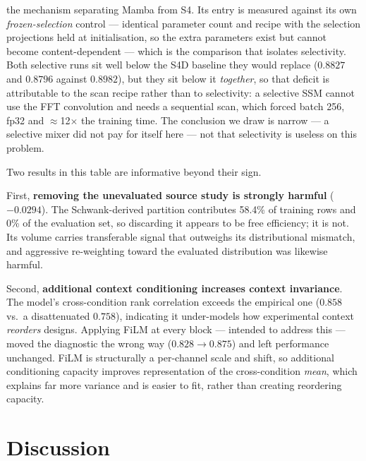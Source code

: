 \documentclass[11pt]{article}
\begin{document}
\begin{table}[H]
\begin{threeparttable}
\begin{tablenotes}[flushleft]
the mechanism separating Mamba \citep{gu2023mamba} from S4. Its entry is measured
against its own \emph{frozen-selection} control --- identical parameter count and
recipe with the selection projections held at initialisation, so the extra parameters
exist but cannot become content-dependent --- which is the comparison that isolates
selectivity. Both selective runs sit well below the S4D baseline they would replace
($0.8827$ and $0.8796$ against $0.8982$), but they sit below it \emph{together}, so
that deficit is attributable to the scan recipe rather than to selectivity: a selective
SSM cannot use the FFT convolution and needs a sequential scan, which forced batch 256,
fp32 and $\approx$12$\times$ the training time. The conclusion we draw is narrow --- a
selective mixer did not pay for itself here --- not that selectivity is useless on this
problem.
\end{tablenotes}
\end{threeparttable}
\end{table}

Two results in this table are informative beyond their sign.

First, \textbf{removing the unevaluated source study is strongly harmful}
($-0.0294$). The Schwank-derived partition contributes 58.4\% of training rows and 0\%
of the evaluation set, so discarding it appears to be free efficiency; it is not. Its
volume carries transferable signal that outweighs its distributional mismatch, and
aggressive re-weighting toward the evaluated distribution was likewise harmful.

Second, \textbf{additional context conditioning increases context invariance}. The
model's cross-condition rank correlation exceeds the empirical one ($0.858$ vs.\ a
disattenuated $0.758$), indicating it under-models how experimental context
\emph{reorders} designs. Applying FiLM at every block --- intended to address this ---
moved the diagnostic the wrong way ($0.828\to0.875$) and left performance unchanged.
FiLM is structurally a per-channel scale and shift, so additional conditioning capacity
improves representation of the cross-condition \emph{mean}, which explains far more
variance and is easier to fit, rather than creating reordering capacity.

\section{Discussion}
\end{document}

